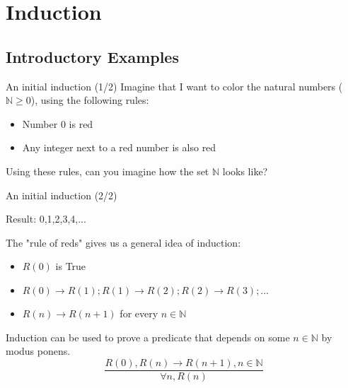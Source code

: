 \section{Induction}


\subsection{Introductory Examples}



\begin{frame}{An initial induction (1/2)}
  Imagine that I want to color the natural numbers ($\mathbb{N} \geq 0$), using the following rules:\bigskip

  \begin{itemize}
    \item Number $0$ is \alert{red}
    \item Any integer next to a \alert{red} number is also \alert{red}
  \end{itemize}\bigskip

  Using these rules, can you imagine how the set $\mathbb{N}$ looks like?
\end{frame}

\begin{frame}{An initial induction (2/2)}

  \begin{center}
    Result: \alert{0,1,2,3,4,...}
  \end{center}\bigskip

  The "rule of reds" gives us a general idea of induction:

  \begin{itemize}
  \item $R(0)$ is True
  \item $R(0) \rightarrow R(1); R(1) \rightarrow R(2); R(2) \rightarrow R(3); \ldots$
  \item $R(n) \rightarrow R(n+1)$ for every $n \in \mathbb{N}$
  \end{itemize}\bigskip

  Induction can be used to prove a predicate that depends on some $n \in \mathbb{N}$ by modus ponens.
  \begin{equation*}
    \frac{R(0), R(n)\rightarrow R(n+1), n\in\mathbb{N}}{\forall n, R(n)}
  \end{equation*}
\end{frame}

